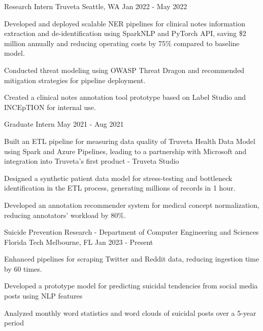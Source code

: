 \vspace{-4mm}
\vspace{-2mm}

\begin{cventries}

	\cventry
	{Research Intern}
	{Truveta}
	{Seattle, WA}
	{Jan 2022 - May 2022}
	{\begin{cvitems}
			\item {Developed and deployed scalable NER pipelines for clinical notes information extraction and de-identification using SparkNLP and PyTorch API, saving \$2 million annually and reducing operating costs by 75\% compared to baseline model.}
			\item {Conducted threat modeling using OWASP Threat Dragon and recommended mitigation strategies for pipeline deployment.}
			\item {Created a clinical notes annotation tool prototype based on Label Studio and INCEpTION for internal use.}
		\end{cvitems}}

	\vspace{-2mm}

	\cventry
	{Graduate Intern}
	{}
	{}
	{May 2021 - Aug 2021}
	{\begin{cvitems}
			\item {Built an ETL pipeline for measuring data quality of Truveta Health Data Model using Spark and Azure Pipelines, leading to a partnership with Microsoft and integration into Truveta's first product - Truveta Studio}
			\item {Designed a synthetic patient data model for stress-testing and bottleneck identification in the ETL process, generating millions of records in 1 hour.}
			\item {Developed an annotation recommender system for medical concept normalization, reducing annotators' workload by 80\%.}
		\end{cvitems}}

	\cventry
	{Suicide Prevention Research - Department of Computer Engineering and Sciences}
	{Florida Tech}
	{Melbourne, FL}
	{Jan 2023 - Present}
	{\begin{cvitems}
			\item {Enhanced pipelines for scraping Twitter and Reddit data, reducing ingestion time by 60 times.}
			\item {Developed a prototype model for predicting suicidal tendencies from social media posts using NLP features}
			\item {Analyzed monthly word statistics and word clouds of suicidal posts over a 5-year period}
		\end{cvitems}}


\end{cventries}
